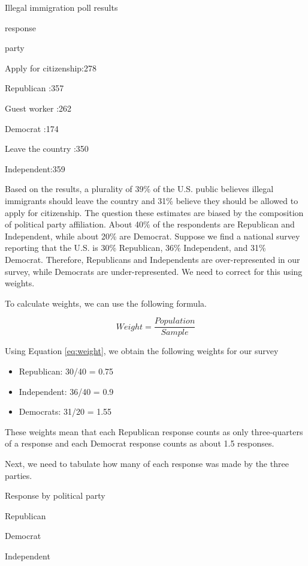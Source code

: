 \documentclass[
]{book}
\providecommand{\tightlist}{%
  \setlength{\itemsep}{0pt}\setlength{\parskip}{0pt}}
\begin{document}
\label{tab:unnamed-chunk-75}Illegal immigration poll results

response

party

Apply for citizenship:278

Republican :357

Guest worker :262

Democrat :174

Leave the country :350

Independent:359

Based on the results, a plurality of 39\% of the U.S. public believes illegal immigrants should leave the country and 31\% believe they should be allowed to apply for citizenship. The question these estimates are biased by the composition of political party affiliation. About 40\% of the respondents are Republican and Independent, while about 20\% are Democrat. Suppose we find a national survey reporting that the U.S. is 30\% Republican, 36\% Independent, and 31\% Democrat. Therefore, Republicans and Independents are over-represented in our survey, while Democrats are under-represented. We need to correct for this using weights.

To calculate weights, we can use the following formula.

\begin{equation}
Weight = \frac{Population}{Sample}
\label{eq:weight}
\end{equation}

Using Equation \eqref{eq:weight}, we obtain the following weights for our survey

\begin{itemize}
\tightlist
\item
  Republican: 30/40 = 0.75
\item
  Independent: 36/40 = 0.9
\item
  Democrats: 31/20 = 1.55
\end{itemize}

These weights mean that each Republican response counts as only three-quarters of a response and each Democrat response counts as about 1.5 responses.

Next, we need to tabulate how many of each response was made by the three parties.

\label{tab:pollparty}Response by political party

Republican

Democrat

Independent
\end{document}
